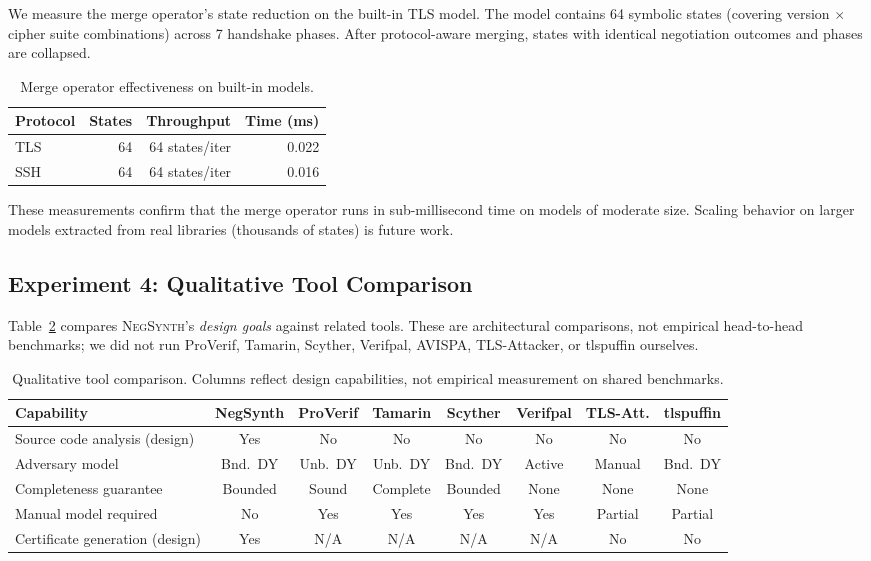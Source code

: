 \documentclass[10pt,twocolumn]{article}
\begin{document}
We measure the merge operator's state reduction on the built-in TLS model.  The model contains 64 symbolic states (covering version $\times$ cipher suite combinations) across 7 handshake phases.  After protocol-aware merging, states with identical negotiation outcomes and phases are collapsed.

\begin{table}[t]
\centering
\caption{Merge operator effectiveness on built-in models.}
\label{tab:merge}
\begin{tabular}{lrrr}
\toprule
\textbf{Protocol} & \textbf{States} & \textbf{Throughput} & \textbf{Time (ms)} \\
\midrule
TLS & 64 & 64 states/iter & 0.022 \\
SSH & 64 & 64 states/iter & 0.016 \\
\bottomrule
\end{tabular}
\end{table}

These measurements confirm that the merge operator runs in sub-millisecond time on models of moderate size.  Scaling behavior on larger models extracted from real libraries (thousands of states) is future work.

\subsection{Experiment 4: Qualitative Tool Comparison}
\label{sec:eval:comparison}

Table~\ref{tab:comparison} compares \textsc{NegSynth}'s \emph{design goals} against related tools.  These are architectural comparisons, not empirical head-to-head benchmarks; we did not run ProVerif, Tamarin, Scyther, Verifpal, AVISPA, TLS-Attacker, or tlspuffin ourselves.

\begin{table}[t]
\centering
\caption{Qualitative tool comparison.  Columns reflect design capabilities, not empirical measurement on shared benchmarks.}
\label{tab:comparison}
\begin{tabular}{lccccccc}
\toprule
\textbf{Capability} & \textbf{NegSynth} & \textbf{ProVerif} & \textbf{Tamarin} & \textbf{Scyther} & \textbf{Verifpal} & \textbf{TLS-Att.} & \textbf{tlspuffin} \\
\midrule
Source code analysis (design) & Yes & No & No & No & No & No & No \\
Adversary model & Bnd.\ DY & Unb.\ DY & Unb.\ DY & Bnd.\ DY & Active & Manual & Bnd.\ DY \\
Completeness guarantee & Bounded & Sound & Complete & Bounded & None & None & None \\
Manual model required & No & Yes & Yes & Yes & Yes & Partial & Partial \\
Certificate generation (design) & Yes & N/A & N/A & N/A & N/A & No & No \\
\bottomrule
\end{tabular}
\end{table}
\end{document}
